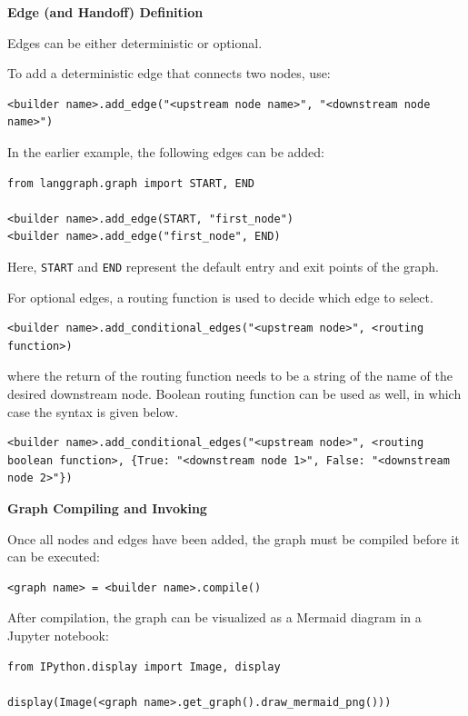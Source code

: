 \vspace{0.1in}
\noindent \textbf{Edge (and Handoff) Definition}
\vspace{0.1in}

Edges can be either deterministic or optional. 

To add a deterministic edge that connects two nodes, use:
\begin{lstlisting}
<builder name>.add_edge("<upstream node name>", "<downstream node name>")
\end{lstlisting}

In the earlier example, the following edges can be added:
\begin{lstlisting}
from langgraph.graph import START, END

<builder name>.add_edge(START, "first_node")
<builder name>.add_edge("first_node", END)
\end{lstlisting}
Here, \texttt{START} and \texttt{END} represent the default entry and exit points of the graph.

For optional edges, a routing function is used to decide which edge to select.
\begin{lstlisting}
<builder name>.add_conditional_edges("<upstream node>", <routing function>)
\end{lstlisting}
where the return of the routing function needs to be a string of the name of the desired downstream node. Boolean routing function can be used as well, in which case the syntax is given below.
\begin{lstlisting}
<builder name>.add_conditional_edges("<upstream node>", <routing boolean function>, {True: "<downstream node 1>", False: "<downstream node 2>"})
\end{lstlisting}

\vspace{0.1in}
\noindent \textbf{Graph Compiling and Invoking}
\vspace{0.1in}

Once all nodes and edges have been added, the graph must be compiled before it can be executed:
\begin{lstlisting}
<graph name> = <builder name>.compile()
\end{lstlisting}

After compilation, the graph can be visualized as a Mermaid diagram in a Jupyter notebook:
\begin{lstlisting}
from IPython.display import Image, display

display(Image(<graph name>.get_graph().draw_mermaid_png()))
\end{lstlisting}

